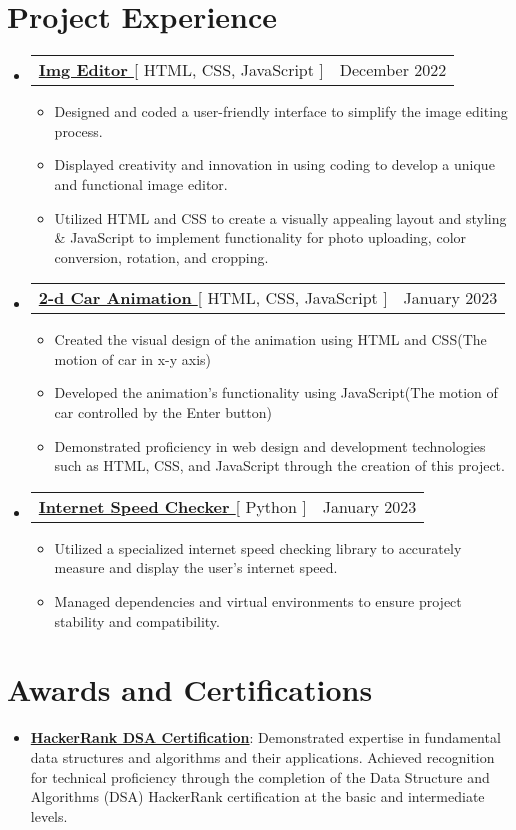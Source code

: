 \documentclass[letterpaper,11pt]{article}
\makeatletter
\newcommand{\resumeItem}[1]{
  \item\small{
    {#1 \vspace{-2pt}}
  }
}
\newcommand{\resumeProjectHeading}[2]{
    \item
    \begin{tabular*}{0.97\textwidth}{l@{\extracolsep{\fill}}r}
      \small#1 & #2 \\
    \end{tabular*}\vspace{-7pt}
}
\newcommand{\resumeSubHeadingListStart}{\begin{itemize}[leftmargin=0.15in, label={}]}
\newcommand{\resumeSubHeadingListEnd}{\end{itemize}}
\newcommand{\resumeItemListStart}{\begin{itemize}}
\newcommand{\resumeItemListEnd}{\end{itemize}\vspace{-5pt}}
\makeatother
\begin{document}
\section{Project Experience}
    
    \resumeSubHeadingListStart
      \resumeProjectHeading
          {\textbf{\href{https://github.com/nihx25/img_editor}{Img Editor }}{[ HTML, CSS, JavaScript ]}}{December 2022}
          \resumeItemListStart
            \resumeItem{Designed and coded a user-friendly interface to simplify the image editing process.}
            \resumeItem{Displayed creativity and innovation in using coding to develop a unique and functional image editor.}
            \resumeItem{Utilized HTML and CSS to create a visually appealing layout and styling \& JavaScript to implement functionality for photo uploading, color conversion, rotation, and cropping.}
          \resumeItemListEnd
    \resumeSubHeadingListEnd

     \resumeSubHeadingListStart
      \resumeProjectHeading
          {\textbf{\href{https://github.com/nihx25/car_animation}{2-d Car Animation }}{[ HTML, CSS, JavaScript ]}}{January 2023}
          \resumeItemListStart
            \resumeItem{Created the visual design of the animation using HTML and CSS(The motion of car in x-y axis)}
            \resumeItem{Developed the animation's functionality using JavaScript(The motion of car controlled by the Enter button)}
            \resumeItem{Demonstrated proficiency in web design and development technologies such as HTML, CSS, and JavaScript through the creation of this project.}
          \resumeItemListEnd
    \resumeSubHeadingListEnd

    \resumeSubHeadingListStart
      \resumeProjectHeading
          {\textbf{\href{https://github.com/nihx25/Internet_speedChecker} {Internet Speed Checker }}{[ Python ]}}{January 2023}
          \resumeItemListStart
           \resumeItem{Utilized a specialized internet speed checking library to accurately measure and display the user's internet speed.}
           \resumeItem{Managed dependencies and virtual environments to ensure project stability and compatibility.}
          \resumeItemListEnd
    \resumeSubHeadingListEnd

\section{Awards and Certifications}
 \begin{itemize}[leftmargin=0.15in, label={}]
    \small{\item{
        \resumeItemListStart
            \resumeItem{\textbf{\href{https://www.hackerrank.com/certificates/d46860607443}{HackerRank DSA Certification}}: Demonstrated expertise in fundamental data structures and algorithms and their applications. Achieved recognition for technical proficiency through the completion of the Data Structure and Algorithms (DSA) HackerRank certification at the basic and intermediate levels.}
            
      \resumeItemListEnd
    }}
 \end{itemize}
\end{document}
